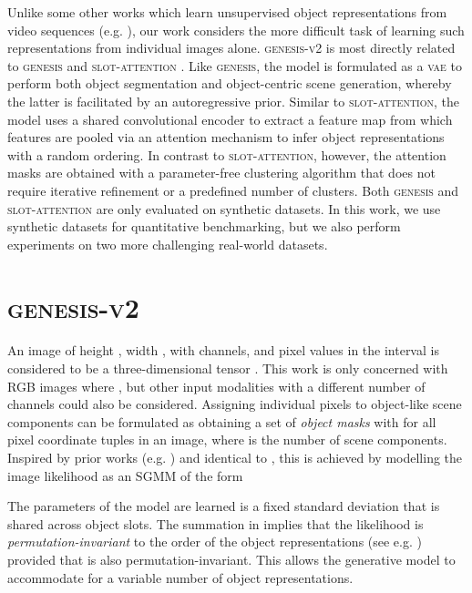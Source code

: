 \documentclass{article}
\begin{document}
Unlike some other works which learn unsupervised object representations from video sequences (e.g. \cite{kosiorek2018sqair,jiang2020scalor}), our work considers the more difficult task of learning such representations from individual images alone.
\textsc{genesis-v2} is most directly related to \textsc{genesis} \cite{engelcke2020genesis} and \textsc{slot-attention} \cite{locatello2020object}.
Like \textsc{genesis}, the model is formulated as a \textsc{vae} to perform both object segmentation and object-centric scene generation, whereby the latter is facilitated by an autoregressive prior.
Similar to \textsc{slot-attention}, the model uses a shared convolutional encoder to extract a feature map from which features are pooled via an attention mechanism to infer object representations with a random ordering.
In contrast to \textsc{slot-attention}, however, the attention masks are obtained with a parameter-free clustering algorithm that does not require iterative refinement or a predefined number of clusters.
Both \textsc{genesis} and \textsc{slot-attention} are only evaluated on synthetic datasets.
In this work, we use synthetic datasets for quantitative benchmarking, but we also perform experiments on two more challenging real-world datasets.

\section{\textsc{genesis-v2}}

An image  of height , width , with  channels, and pixel values in the interval  is considered to be a three-dimensional tensor .
This work is only concerned with RGB images where , but other input modalities with a different number of channels could also be considered.
Assigning individual pixels to object-like scene components can be formulated as obtaining a set of \emph{object masks}  with  for all pixel coordinate tuples  in an image, where  is the number of scene components.
Inspired by prior works (e.g. \cite{burgess2019monet,greff2019multi}) and identical to \citet{engelcke2020genesis}, this is achieved by modelling the image likelihood  as an SGMM of the form

The parameters  of the model are learned  is a fixed standard deviation that is shared across object slots.
The summation in  implies that the likelihood is \emph{permutation-invariant} to the order of the object representations  (see e.g. \cite{zaheer2017deep,wagstaff2019limitations}) provided that  is also permutation-invariant.
This allows the generative model to accommodate for a variable number of object representations.
\end{document}
